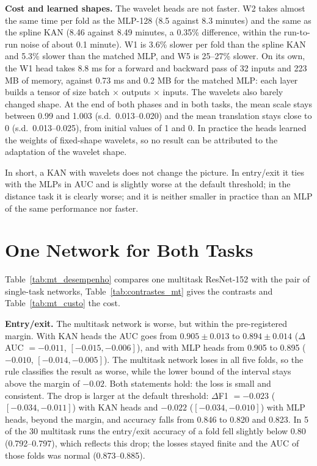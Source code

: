 

\textbf{Cost and learned shapes.} The wavelet heads are not faster. W2 takes almost the same time per fold as the MLP-128 (8.5 against 8.3 minutes) and the same as the spline KAN (8.46 against 8.49 minutes, a 0.35\% difference, within the run-to-run noise of about 0.1 minute). W1 is 3.6\% slower per fold than the spline KAN and 5.3\% slower than the matched MLP, and W5 is 25--27\% slower. On its own, the W1 head takes 8.8 ms for a forward and backward pass of 32 inputs and 223 MB of memory, against 0.73 ms and 0.2 MB for the matched MLP: each layer builds a tensor of size batch $\times$ outputs $\times$ inputs. The wavelets also barely changed shape. At the end of both phases and in both tasks, the mean scale stays between 0.99 and 1.003 (s.d.\ 0.013--0.020) and the mean translation stays close to 0 (s.d.\ 0.013--0.025), from initial values of 1 and 0. In practice the heads learned the weights of fixed-shape wavelets, so no result can be attributed to the adaptation of the wavelet shape.

In short, a KAN with wavelets does not change the picture. In entry/exit it ties with the MLPs in AUC and is slightly worse at the default threshold; in the distance task it is clearly worse; and it is neither smaller in practice than an MLP of the same performance nor faster.

\section{One Network for Both Tasks}
\label{sec:res_mt}

Table~\ref{tab:mt_desempenho} compares one multitask ResNet-152 with the pair of single-task networks, Table~\ref{tab:contrastes_mt} gives the contrasts and Table~\ref{tab:mt_custo} the cost.



\textbf{Entry/exit.} The multitask network is worse, but within the pre-registered margin. With KAN heads the AUC goes from $0.905 \pm 0.013$ to $0.894 \pm 0.014$ ($\Delta$AUC $= -0.011$, $[-0.015, -0.006]$), and with MLP heads from 0.905 to 0.895 ($-0.010$, $[-0.014, -0.005]$). The multitask network loses in all five folds, so the rule classifies the result as worse, while the lower bound of the interval stays above the margin of $-0.02$. Both statements hold: the loss is small and consistent. The drop is larger at the default threshold: $\Delta$F1 $= -0.023$ ($[-0.034, -0.011]$) with KAN heads and $-0.022$ ($[-0.034, -0.010]$) with MLP heads, beyond the margin, and accuracy falls from 0.846 to 0.820 and 0.823. In 5 of the 30 multitask runs the entry/exit accuracy of a fold fell slightly below 0.80 (0.792--0.797), which reflects this drop; the losses stayed finite and the AUC of those folds was normal (0.873--0.885).

